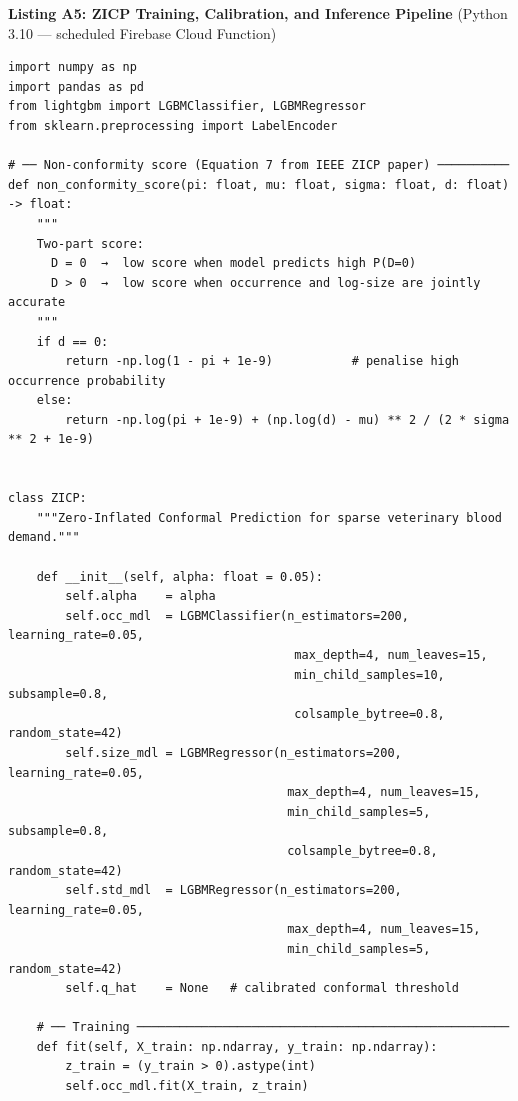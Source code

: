 \documentclass[12pt,a4paper]{article}
\begin{document}
\noindent\textbf{Listing A5: ZICP Training, Calibration, and Inference Pipeline}
(Python 3.10 — scheduled Firebase Cloud Function)
\begin{lstlisting}[language=Python3, caption={Complete Zero-Inflated Conformal Prediction (ZICP) implementation as described in the IEEE ZICP paper. LightGBM models are trained for occurrence and log-normal size; non-conformity scores are computed on held-out calibration data; the empirical quantile threshold is used to construct distribution-free prediction intervals for the next 7 days per clinic per blood type.}]
import numpy as np
import pandas as pd
from lightgbm import LGBMClassifier, LGBMRegressor
from sklearn.preprocessing import LabelEncoder

# ── Non-conformity score (Equation 7 from IEEE ZICP paper) ──────────
def non_conformity_score(pi: float, mu: float, sigma: float, d: float) -> float:
    """
    Two-part score:
      D = 0  →  low score when model predicts high P(D=0)
      D > 0  →  low score when occurrence and log-size are jointly accurate
    """
    if d == 0:
        return -np.log(1 - pi + 1e-9)           # penalise high occurrence probability
    else:
        return -np.log(pi + 1e-9) + (np.log(d) - mu) ** 2 / (2 * sigma ** 2 + 1e-9)


class ZICP:
    """Zero-Inflated Conformal Prediction for sparse veterinary blood demand."""

    def __init__(self, alpha: float = 0.05):
        self.alpha    = alpha
        self.occ_mdl  = LGBMClassifier(n_estimators=200, learning_rate=0.05,
                                        max_depth=4, num_leaves=15,
                                        min_child_samples=10, subsample=0.8,
                                        colsample_bytree=0.8, random_state=42)
        self.size_mdl = LGBMRegressor(n_estimators=200, learning_rate=0.05,
                                       max_depth=4, num_leaves=15,
                                       min_child_samples=5, subsample=0.8,
                                       colsample_bytree=0.8, random_state=42)
        self.std_mdl  = LGBMRegressor(n_estimators=200, learning_rate=0.05,
                                       max_depth=4, num_leaves=15,
                                       min_child_samples=5, random_state=42)
        self.q_hat    = None   # calibrated conformal threshold

    # ── Training ────────────────────────────────────────────────────
    def fit(self, X_train: np.ndarray, y_train: np.ndarray):
        z_train = (y_train > 0).astype(int)
        self.occ_mdl.fit(X_train, z_train)


\end{lstlisting}
\end{document}
